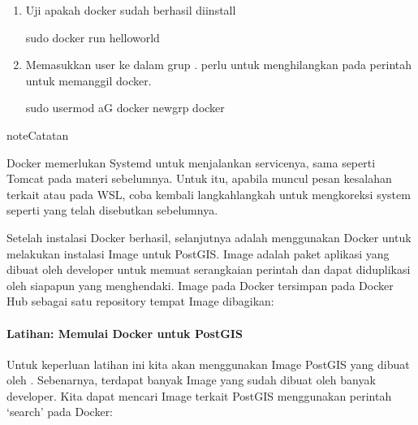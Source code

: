 \documentclass[letterpaper,10pt,english]{sphinxmanual}
\begin{document}
\begin{enumerate}
\begin{sphinxVerbatim}[commandchars=\\\{\}]
sudo apt\PYGZhy{}get update
sudo apt\PYGZhy{}get install docker\PYGZhy{}ce docker\PYGZhy{}ce\PYGZhy{}cli containerd.io
\end{sphinxVerbatim}

\item {} 
Uji apakah docker sudah berhasil diinstall

\begin{sphinxVerbatim}[commandchars=\\\{\}]
sudo docker run hello\PYGZhy{}world
\end{sphinxVerbatim}

\item {} 
Memasukkan user ke dalam grup .  perlu untuk menghilangkan  pada perintah untuk memanggil docker.

\begin{sphinxVerbatim}[commandchars=\\\{\}]
sudo usermod \PYGZhy{}aG docker 
newgrp docker 
\end{sphinxVerbatim}

\end{enumerate}

\begin{sphinxadmonition}{note}{Catatan}

Docker memerlukan Systemd untuk menjalankan servicenya, sama seperti Tomcat pada materi sebelumnya. Untuk itu, apabila muncul pesan kesalahan terkait  atau  pada WSL, coba kembali langkah\sphinxhyphen{}langkah untuk mengkoreksi system seperti yang telah disebutkan sebelumnya.
\end{sphinxadmonition}

Setelah instalasi Docker berhasil, selanjutnya adalah menggunakan Docker untuk melakukan instalasi Image untuk PostGIS. Image adalah paket aplikasi yang dibuat oleh developer untuk memuat serangkaian perintah dan dapat diduplikasi oleh siapapun yang menghendaki. Image pada Docker tersimpan pada Docker Hub sebagai satu repository tempat Image dibagikan:



\paragraph{Latihan: Memulai Docker untuk PostGIS}
\label{\detokenize{sesi2/relationaldb:latihan-memulai-docker-untuk-postgis}}
Untuk keperluan latihan ini kita akan menggunakan Image PostGIS yang dibuat oleh . Sebenarnya, terdapat banyak Image yang sudah dibuat oleh banyak developer. Kita dapat mencari Image terkait PostGIS menggunakan perintah ‘search’ pada Docker:
\end{document}
